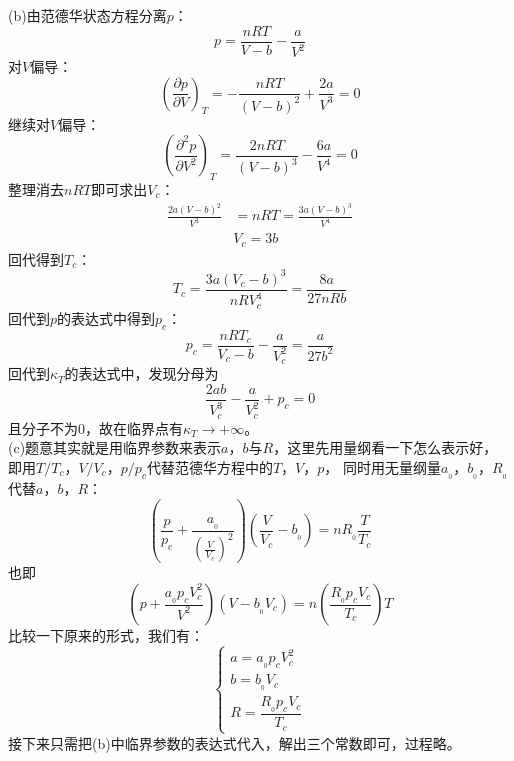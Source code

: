 \begin{solution}
        (b)由范德华状态方程分离$p$：
        \begin{equation*}
            p = \frac{nRT}{V-b}-\frac{a}{V^{2}}
        \end{equation*}
        对$V$偏导：
        \begin{equation*}
            \left(\frac{\partial p}{\partial V}\right)_{T} = -\frac{nRT}{(V-b)^{2}} + \frac{2a}{V^{3}} = 0
        \end{equation*}
        继续对$V$偏导：
        \begin{equation*}
            \left(\frac{\partial^{2} p}{\partial V^{2}}\right)_{T} = \frac{2nRT}{(V-b)^{3}} - \frac{6a}{V^{4}} = 0
        \end{equation*}
        整理消去$nRT$即可求出$V_c$：
        \begin{equation*}
            \begin{aligned}
                \frac{2a(V-b)^{2}}{V^{3}} &= nRT = \frac{3a(V-b)^{3}}{V^{4}}\\
                &V_c = 3b
            \end{aligned}
        \end{equation*}
        回代得到$T_c$：
        \begin{equation*}
            T_c = \frac{3a(V_{c}-b)^{3}}{nRV_{c}^{4}} = \frac{8a}{27nRb}
        \end{equation*}
        回代到$p$的表达式中得到$p_c$：
        \begin{equation*}
            p_c = \frac{nRT_c}{V_{c}-b}-\frac{a}{V_{c}^{2}} = \frac{a}{27b^{2}}
        \end{equation*}
        回代到$\kappa_T$的表达式中，发现分母为
        \begin{equation*}
            \frac{2ab}{V_{c}^{3}}-\frac{a}{V_{c}^{2}}+p_{c} = 0
        \end{equation*}
        且分子不为$0$，故在临界点有$\kappa_T\rightarrow +\infty$。
        \\

        (c)题意其实就是用临界参数来表示$a$，$b$与$R$，这里先用量纲看一下怎么表示好，
        即用$T/T_c$，$V/V_c$，$p/p_c$代替范德华方程中的$T$，$V$，$p$，
        同时用无量纲量$a_{_0}$，$b_{_0}$，$R_{_0}$代替$a$，$b$，$R$：
        \begin{equation*}
                (\frac{p}{p_c}+\frac{a_{_0}}{\left(\frac{V}{V_c}\right)^{2}})(\frac{V}{V_c}-b_{_0})=nR_{_0}\frac{T}{T_c}
        \end{equation*}        
        也即
        \[(p+\frac{a_{_0}p_{c}V_{c}^2}{V^2})(V-b_{_0}V_c) = n(\frac{R_{_0}p_{c}V_{c}}{T_{c}})T\]
        比较一下原来的形式，我们有：
        \begin{equation*}
            \begin{cases}
                a = a_{_0}p_{c}V_{c}^2\\
                b = b_{_0}V_c\\
                R = \dfrac{R_{_0}p_{c}V_{c}}{T_{c}}
            \end{cases}
        \end{equation*}
        接下来只需把(b)中临界参数的表达式代入，解出三个常数即可，过程略。
        

\end{solution}
